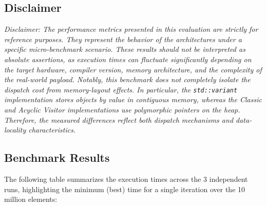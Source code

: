 \subsection{Disclaimer}
\textit{Disclaimer: The performance metrics presented in this evaluation are strictly for reference purposes. They represent the behavior of the architectures under a specific micro-benchmark scenario. These results should not be interpreted as absolute assertions, as execution times can fluctuate significantly depending on the target hardware, compiler version, memory architecture, and the complexity of the real-world payload. Notably, this benchmark does not completely isolate the dispatch cost from memory-layout effects. In particular, the \texttt{std::variant} implementation stores objects by value in contiguous memory, whereas the Classic and Acyclic Visitor implementations use polymorphic pointers on the heap. Therefore, the measured differences reflect both dispatch mechanisms and data-locality characteristics.}

\subsection{Benchmark Results}
The following table summarizes the execution times across the 3 independent runs, highlighting the minimum (best) time for a single iteration over the 10 million elements:

\begin{table}[H]
    \centering
    \caption{Benchmark results for processing 10,000,000 objects.}
    \label{tab:benchmark_results}
\end{table}
